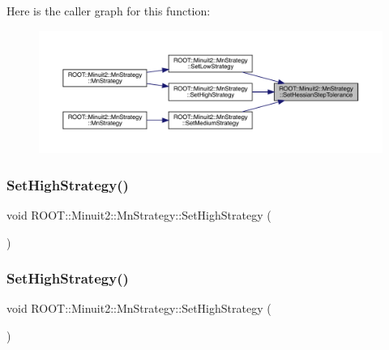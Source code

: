 Here is the caller graph for this function\+:\nopagebreak
\begin{figure}[H]
\begin{center}
\leavevmode
\includegraphics[width=350pt]{da/de4/classROOT_1_1Minuit2_1_1MnStrategy_a8711f7c9983983c83fd5d192bc9304f7_icgraph}
\end{center}
\end{figure}
\mbox{\label{classROOT_1_1Minuit2_1_1MnStrategy_a92e5deb2087eec6e0d7db5d5789f3a06}} 
\subsubsection{\texorpdfstring{SetHighStrategy()}{SetHighStrategy()}\hspace{0.1cm}{\footnotesize\ttfamily [1/2]}}
{\footnotesize\ttfamily void R\+O\+O\+T\+::\+Minuit2\+::\+Mn\+Strategy\+::\+Set\+High\+Strategy (\begin{DoxyParamCaption}{ }\end{DoxyParamCaption})}

\mbox{\label{classROOT_1_1Minuit2_1_1MnStrategy_a92e5deb2087eec6e0d7db5d5789f3a06}} 
\subsubsection{\texorpdfstring{SetHighStrategy()}{SetHighStrategy()}\hspace{0.1cm}{\footnotesize\ttfamily [2/2]}}
{\footnotesize\ttfamily void R\+O\+O\+T\+::\+Minuit2\+::\+Mn\+Strategy\+::\+Set\+High\+Strategy (\begin{DoxyParamCaption}{ }\end{DoxyParamCaption})}

